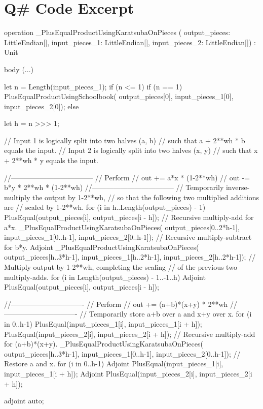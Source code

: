 \documentclass[onecolumn]{quantumarticle}
\begin{document}
\section{Q\# Code Excerpt}

\label{app:qsharp}
\begin{qsharp}
operation _PlusEqualProductUsingKaratsubaOnPieces (
        output_pieces: LittleEndian[],
        input_pieces_1: LittleEndian[],
        input_pieces_2: LittleEndian[]) : Unit {
  body (...) {
    let n = Length(input_pieces_1);
    if (n <= 1) {
      if (n == 1) {
        PlusEqualProductUsingSchoolbook(
            output_pieces[0],
            input_pieces_1[0],
            input_pieces_2[0]);
      }
    } else {
      let h = n >>> 1;

      // Input 1 is logically split into two halves (a, b)
      //   such that a + 2**wh * b equals the input.
      // Input 2 is logically split into two halves (x, y)
      //   such that x + 2**wh * y equals the input.

      //-----------------------------------
      // Perform
      //     out += a*x * (1-2**wh)
      //     out -= b*y * 2**wh * (1-2**wh)
      //-----------------------------------
      // Temporarily inverse-multiply the output by 1-2**wh,
      // so that the following two multiplied additions are
      // scaled by 1-2**wh.
      for (i in h..Length(output_pieces) - 1) {
        PlusEqual(output_pieces[i], output_pieces[i - h]);
      }
      // Recursive multiply-add for a*x.
      _PlusEqualProductUsingKaratsubaOnPieces(
        output_pieces[0..2*h-1],
        input_pieces_1[0..h-1],
        input_pieces_2[0..h-1]);
      // Recursive multiply-subtract for b*y.
      Adjoint _PlusEqualProductUsingKaratsubaOnPieces(
        output_pieces[h..3*h-1],
        input_pieces_1[h..2*h-1],
        input_pieces_2[h..2*h-1]);
      // Multiply output by 1-2**wh, completing the scaling
      // of the previous two multiply-adds.
      for (i in Length(output_pieces) - 1..-1..h) {
        Adjoint PlusEqual(output_pieces[i],
                          output_pieces[i - h]);
      }

      //-------------------------------
      // Perform
      //     out += (a+b)*(x+y) * 2**wh
      //-------------------------------
      // Temporarily store a+b over a and x+y over x.
      for (i in 0..h-1) {
        PlusEqual(input_pieces_1[i],
                  input_pieces_1[i + h]);
        PlusEqual(input_pieces_2[i],
                  input_pieces_2[i + h]);
      }
      // Recursive multiply-add for (a+b)*(x+y).
      _PlusEqualProductUsingKaratsubaOnPieces(
        output_pieces[h..3*h-1],
        input_pieces_1[0..h-1],
        input_pieces_2[0..h-1]);
      // Restore a and x.
      for (i in 0..h-1) {
        Adjoint PlusEqual(input_pieces_1[i],
                          input_pieces_1[i + h]);
        Adjoint PlusEqual(input_pieces_2[i],
                          input_pieces_2[i + h]);
      }
    }
  }
  adjoint auto;
}
\end{qsharp}
\end{document}
